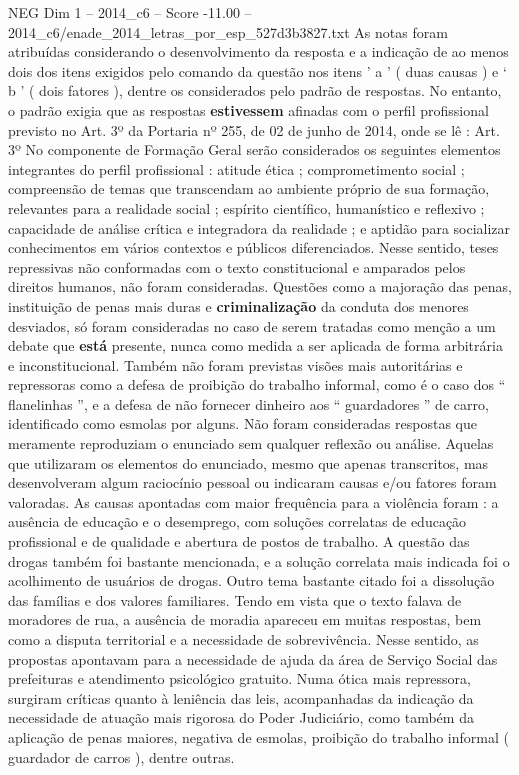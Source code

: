 \begin{textsample}{NEG Dim 1 – 2014\_c6 – Score -11.00 – 2014\_c6/enade\_2014\_letras\_por\_esp\_527d3b3827.txt}
As notas foram atribuídas considerando o desenvolvimento da resposta e a indicação de ao menos dois dos itens exigidos pelo comando da questão nos itens ’ a ’ ( duas causas ) e ‘ b ’ ( dois fatores ), dentre os considerados pelo padrão de respostas.
No entanto, o padrão exigia que as respostas \textbf{estivessem} afinadas com o perfil profissional previsto no Art. 3º da Portaria nº 255, de 02 de junho de 2014, onde se lê : Art. 3º No componente de Formação Geral serão considerados os seguintes elementos integrantes do perfil profissional : atitude ética ; comprometimento social ; compreensão de temas que transcendam ao ambiente próprio de sua formação, relevantes para a realidade social ; espírito científico, humanístico e reflexivo ; capacidade de análise crítica e integradora da realidade ; e aptidão para socializar conhecimentos em vários contextos e públicos diferenciados.
Nesse sentido, teses repressivas não conformadas com o texto constitucional e amparados pelos direitos humanos, não foram consideradas.
Questões como a majoração das penas, instituição de penas mais duras e \textbf{criminalização} da conduta dos menores desviados, só foram consideradas no caso de serem tratadas como menção a um debate que \textbf{está} presente, nunca como medida a ser aplicada de forma arbitrária e inconstitucional.
Também não foram previstas visões mais autoritárias e repressoras como a defesa de proibição do trabalho informal, como é o caso dos “ flanelinhas ”, e a defesa de não fornecer dinheiro aos “ guardadores ” de carro, identificado como esmolas por alguns.
Não foram consideradas respostas que meramente reproduziam o enunciado sem qualquer reflexão ou análise.
Aquelas que utilizaram os elementos do enunciado, mesmo que apenas transcritos, mas desenvolveram algum raciocínio pessoal ou indicaram causas e/ou fatores foram valoradas.
As causas apontadas com maior frequência para a violência foram : a ausência de educação e o desemprego, com soluções correlatas de educação profissional e de qualidade e abertura de postos de trabalho.
A questão das drogas também foi bastante mencionada, e a solução correlata mais indicada foi o acolhimento de usuários de drogas.
Outro tema bastante citado foi a dissolução das famílias e dos valores familiares.
Tendo em vista que o texto falava de moradores de rua, a ausência de moradia apareceu em muitas respostas, bem como a disputa territorial e a necessidade de sobrevivência.
Nesse sentido, as propostas apontavam para a necessidade de ajuda da área de Serviço Social das prefeituras e atendimento psicológico gratuito.
Numa ótica mais repressora, surgiram críticas quanto à leniência das leis, acompanhadas da indicação da necessidade de atuação mais rigorosa do Poder Judiciário, como também da aplicação de penas maiores, negativa de esmolas, proibição do trabalho informal ( guardador de carros ), dentre outras.

\end{textsample}
